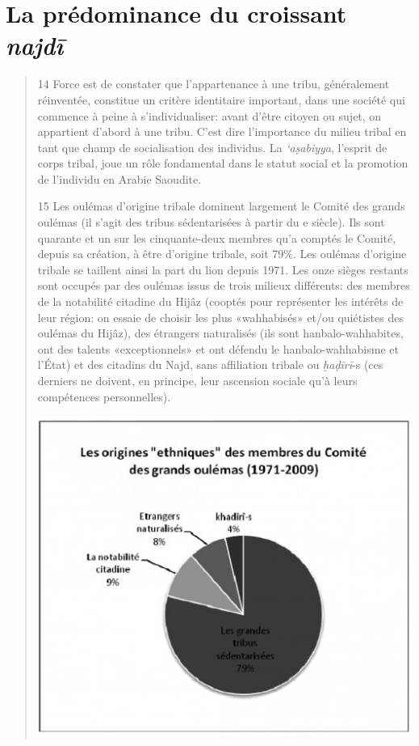 \hypertarget{la-pruxe9dominance-du-croissant-najdux12b}{%
\section{\texorpdfstring{La prédominance du croissant
\emph{najdī}}{La prédominance du croissant najdī}}\label{la-pruxe9dominance-du-croissant-najdux12b}}

\begin{quote}
14 Force est de constater que l'appartenance à une tribu, généralement
réinventée, constitue un critère identitaire important, dans une société
qui commence à peine à s'individualiser: avant d'être citoyen ou sujet,
on appartient d'abord à une tribu. C'est dire l'importance du milieu
tribal en tant que champ de socialisation des individus. La
\emph{`aṣabiyya}, l'esprit de corps tribal, joue un rôle fondamental
dans le statut social et la promotion de l'individu en Arabie Saoudite.

15 Les oulémas d'origine tribale dominent largement le Comité des grands
oulémas (il s'agit des tribus sédentarisées à partir du e siècle). Ils
sont quarante et un sur les cinquante-deux membres qu'a comptés le
Comité, depuis sa création, à être d'origine tribale, soit 79\%. Les
oulémas d'origine tribale se taillent ainsi la part du lion depuis 1971.
Les onze sièges restants sont occupés par des oulémas issus de trois
milieux différents: des membres de la notabilité citadine du Hijâz
(cooptés pour représenter les intérêts de leur région: on essaie de
choisir les plus «wahhabisés» et/ou quiétistes des oulémas du Hijâz),
des étrangers naturalisés (ils sont hanbalo-wahhabites, ont des talents
«exceptionnels» et ont défendu le hanbalo-wahhabisme et l'État) et des
citadins du Najd, sans affiliation tribale ou \emph{ḫaḍīrī}-s (ces
derniers ne doivent, en principe, leur ascension sociale qu'à leurs
compétences personnelles).
\begin{marginfigure}
\includegraphics[width=1.2\textwidth]{CourantsIslamContemporain/ImagesCourantsIslamContemporain/image10.jpeg}
\end{marginfigure}



\end{quote}
